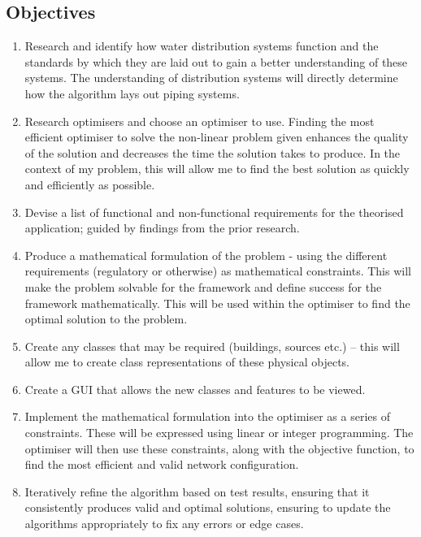 \subsection{Objectives}\label{objectives}
\begin{enumerate}
    \item Research and identify how water distribution systems function and the standards by which they are laid out to gain a better understanding of these systems. The understanding of distribution systems will directly determine how the algorithm lays out piping systems.
    \item Research optimisers and choose an optimiser to use. Finding the most efficient optimiser to solve the non-linear problem given enhances the quality of the solution and decreases the time the solution takes to produce. In the context of my problem, this will allow me to find the best solution as quickly and efficiently as possible.
    \item Devise a list of functional and non-functional requirements for the theorised application; guided by findings from the prior research.
    \item Produce a mathematical formulation of the problem - using the different requirements (regulatory or otherwise) as mathematical constraints. This will make the problem solvable for the framework and define success for the framework mathematically. This will be used within the optimiser to find the optimal solution to the problem.
    \item Create any classes that may be required (buildings, sources etc.) – this will allow me to create class representations of these physical objects.
    \item Create a GUI that allows the new classes and features to be viewed.
    \item Implement the mathematical formulation into the optimiser as a series of constraints. These will be expressed using linear or integer programming. The optimiser will then use these constraints, along with the objective function, to find the most efficient and valid network configuration.
    \item Iteratively refine the algorithm based on test results, ensuring that it consistently produces valid and optimal solutions, ensuring to update the algorithms appropriately to fix any errors or edge cases.
\end{enumerate}




